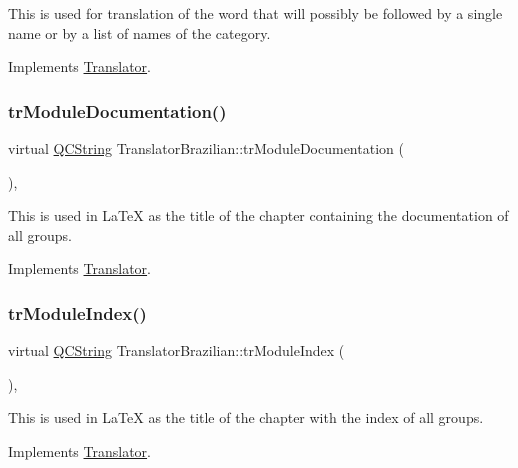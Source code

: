 This is used for translation of the word that will possibly be followed by a single name or by a list of names of the category. 

Implements \mbox{\hyperlink{class_translator}{Translator}}.

\mbox{\label{class_translator_brazilian_a8d44e258c9698a4e60bfe7cf6641aed4}} 
\subsubsection{\texorpdfstring{trModuleDocumentation()}{trModuleDocumentation()}}
{\footnotesize\ttfamily virtual \mbox{\hyperlink{class_q_c_string}{Q\+C\+String}} Translator\+Brazilian\+::tr\+Module\+Documentation (\begin{DoxyParamCaption}{ }\end{DoxyParamCaption})\hspace{0.3cm}{\ttfamily [inline]}, {\ttfamily [virtual]}}

This is used in La\+TeX as the title of the chapter containing the documentation of all groups. 

Implements \mbox{\hyperlink{class_translator}{Translator}}.

\mbox{\label{class_translator_brazilian_a75e8b92a5f77f1396952112766a49054}} 
\subsubsection{\texorpdfstring{trModuleIndex()}{trModuleIndex()}}
{\footnotesize\ttfamily virtual \mbox{\hyperlink{class_q_c_string}{Q\+C\+String}} Translator\+Brazilian\+::tr\+Module\+Index (\begin{DoxyParamCaption}{ }\end{DoxyParamCaption})\hspace{0.3cm}{\ttfamily [inline]}, {\ttfamily [virtual]}}

This is used in La\+TeX as the title of the chapter with the index of all groups. 

Implements \mbox{\hyperlink{class_translator}{Translator}}.

